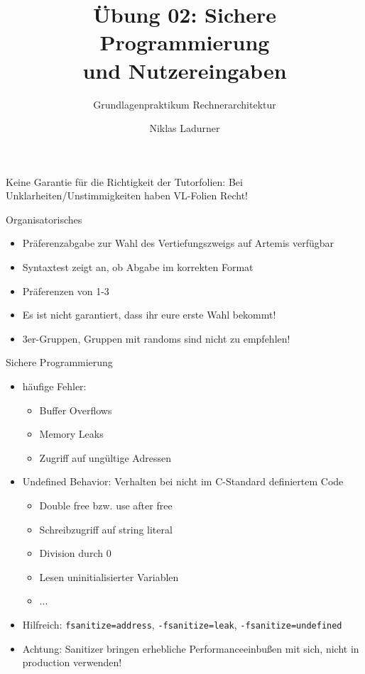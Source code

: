 \documentclass[
  german,            %
  aspectratio=169,    %
]{tumbeamer}
\title{Übung 02: Sichere Programmierung\\ und Nutzereingaben}
\subtitle{Grundlagenpraktikum Rechnerarchitektur}
\author{Niklas Ladurner}
\institute{\theChairName\\\theDepartmentName\\\theUniversityName}
\date{\DTMdisplaydate{2024}{4}{26}{-1}}
\begin{document}
\maketitle

\begin{frame}[c]{}{}
  \begin{center}
    \LARGE  Keine Garantie für die Richtigkeit der Tutorfolien: Bei Unklarheiten/Unstimmigkeiten
    haben VL-Folien Recht!
  \end{center}
\end{frame}

\begin{frame}[c]{Organisatorisches}{}
  \begin{itemize}
    \item Präferenzabgabe zur Wahl des Vertiefungszweigs auf Artemis verfügbar
    \item Syntaxtest zeigt an, ob Abgabe im korrekten Format
    \item Präferenzen von 1-3
    \item Es ist nicht garantiert, dass ihr eure erste Wahl bekommt!
    \item 3er-Gruppen, Gruppen mit randoms sind nicht zu empfehlen!
  \end{itemize}
\end{frame}


\begin{frame}[c, fragile]{Sichere Programmierung}{}
  \begin{itemize}
    \item häufige Fehler:
    \begin{itemize}
      \item Buffer Overflows
      \item Memory Leaks
      \item Zugriff auf ungültige Adressen  
    \end{itemize}
    \item Undefined Behavior: Verhalten bei nicht im C-Standard definiertem Code
    \begin{itemize}
      \item Double free bzw. use after free
      \item Schreibzugriff auf string literal
      \item Division durch 0
      \item Lesen uninitialisierter Variablen
      \item ...
    \end{itemize}
    \item Hilfreich: \verb|fsanitize=address|, \verb|-fsanitize=leak|, \verb|-fsanitize=undefined|
    \item Achtung: Sanitizer bringen erhebliche Performanceeinbußen mit sich, nicht in production verwenden!
  \end{itemize}
\end{frame}
\end{document}

